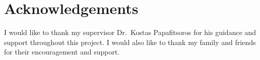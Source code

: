 \chapter*{Acknowledgements}
I would like to thank my supervisor Dr.\ Kostas Papafitsoros for his guidance and support throughout this project. 
I would also like to thank my family and friends for their encouragement and support.